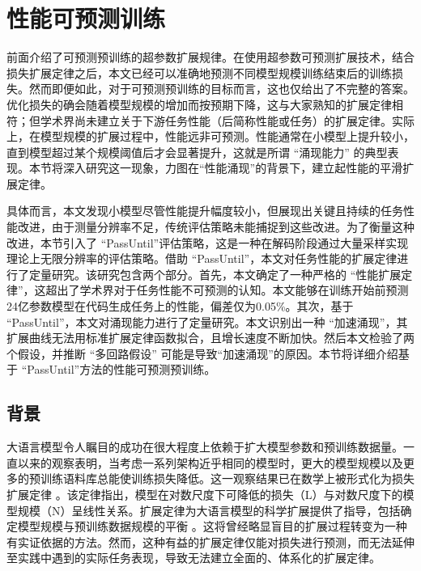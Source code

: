 


\section{性能可预测训练}

前面介绍了可预测预训练的超参数扩展规律。在使用超参数可预测扩展技术，结合损失扩展定律之后，本文已经可以准确地预测不同模型规模训练结束后的训练损失。然而即便如此，对于可预测预训练的目标而言，这也仅给出了不完整的答案。优化损失的确会随着模型规模的增加而按预期下降，这与大家熟知的扩展定律相符；但学术界尚未建立关于下游任务性能（后简称性能或任务）的扩展定律。实际上，在模型规模的扩展过程中，性能远非可预测。性能通常在小模型上提升较小，直到模型超过某个规模阈值后才会显著提升，这就是所谓 “涌现能力” 的典型表现。本节将深入研究这一现象，力图在“性能涌现”的背景下，建立起性能的平滑扩展定律。

具体而言，本文发现小模型尽管性能提升幅度较小，但展现出关键且持续的任务性能改进，由于测量分辨率不足，传统评估策略未能捕捉到这些改进。为了衡量这种改进，本节引入了 “PassUntil”评估策略，这是一种在解码阶段通过大量采样实现理论上无限分辨率的评估策略。借助 “PassUntil”，本文对任务性能的扩展定律进行了定量研究。该研究包含两个部分。首先，本文确定了一种严格的 “性能扩展定律”，这超出了学术界对于任务性能不可预测的认知。本文能够在训练开始前预测24亿参数模型在代码生成任务上的性能，偏差仅为0.05\%。其次，基于 “PassUntil”，本文对涌现能力进行了定量研究。本文识别出一种 “加速涌现”，其扩展曲线无法用标准扩展定律函数拟合，且增长速度不断加快。然后本文检验了两个假设，并推断 “多回路假设” 可能是导致“加速涌现”的原因。本节将详细介绍基于 “PassUntil”方法的性能可预测预训练。

\subsection{背景}

大语言模型令人瞩目的成功在很大程度上依赖于扩大模型参数和预训练数据量。一直以来的观察表明，当考虑一系列架构近乎相同的模型时，更大的模型规模以及更多的预训练语料库总能使训练损失降低。这一观察结果已在数学上被形式化为损失扩展定律 \citep{kaplan2020scaling, henighan2020scaling}。该定律指出，模型在对数尺度下可降低的损失（L）与对数尺度下的模型规模（N）呈线性关系。扩展定律为大语言模型的科学扩展提供了指导，包括确定模型规模与预训练数据规模的平衡 \citep{hoffmann2022training, muennighoff2023scaling}。这将曾经略显盲目的扩展过程转变为一种有实证依据的方法。然而，这种有益的扩展定律仅能对损失进行预测，而无法延伸至实践中遇到的实际任务表现\cite{ganguli2022predictability}，导致无法建立全面的、体系化的扩展定律。


